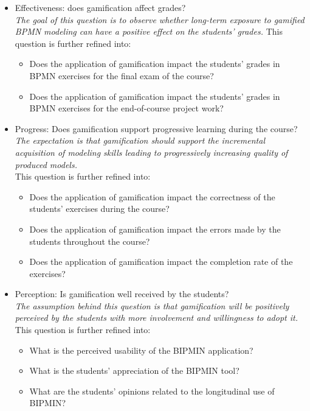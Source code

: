\begin{itemize}
    \item[\textbf{RQ1}] Effectiveness: does gamification affect grades?\\
    \textit{The goal of this question is to observe whether long-term exposure to gamified BPMN modeling can have a positive effect on the students' grades.}
    This question is further refined into:
    \begin{itemize}
        \item[\textbf{RQ1.1}] Does the application of gamification impact the students’ grades in BPMN exercises for the final exam of the course?
        \item[\textbf{RQ1.2:}] Does the application of gamification impact the students' grades in BPMN exercises for the end-of-course project work?
    \end{itemize}
    \item[\textbf{RQ2}] Progress: Does gamification support progressive learning during the course?\\
    \emph{The expectation is that gamification should support the incremental acquisition of modeling skills leading to progressively increasing quality of produced models.}\\
    This question is further refined into:
    \begin{itemize}
        \item[\textbf{RQ2.1:}] Does the application of gamification impact the correctness of the students' exercises during the course?
        \item[\textbf{RQ2.2:}] Does the application of gamification impact the errors made by the students throughout the course?
        \item[\textbf{RQ2.3:}] Does the application of gamification impact the completion rate of the exercises?
    \end{itemize}
    \item[\textbf{RQ3}] Perception: Is gamification well received by the students?\\
    \emph{The assumption behind this question is that gamification will be positively perceived by the students with more involvement and willingness to adopt it.}\\
    This question is further refined into:
    \begin{itemize}
        \item[\textbf{RQ3.1:}] What is the perceived usability of the BIPMIN application?
        \item[\textbf{RQ3.2:}] What is the students' appreciation of the BIPMIN tool?
        \item[\textbf{RQ3.3}:] What are the students' opinions related to the longitudinal use of BIPMIN?
    \end{itemize}
\end{itemize}


